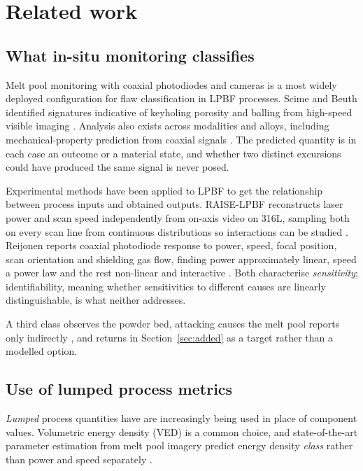 \documentclass[final,5p,times,twocolumn]{elsarticle}
\begin{document}
\section{Related work}

\subsection{What in-situ monitoring classifies}

Melt pool monitoring with coaxial photodiodes and cameras is a most widely
deployed configuration for flaw classification in LPBF processes.
Scime and Beuth identified signatures indicative of keyholing porosity and
balling from high-speed visible imaging \cite{Scime2019}. Analysis also exists across modalities and alloys, including mechanical-property prediction from
coaxial signals \cite{Raj2023}. The predicted quantity is in each case an outcome
or a material state, and whether two distinct excursions could have produced the
same signal is never posed.

Experimental methods have been applied to LPBF to get the relationship between process inputs and obtained outputs. RAISE-LPBF reconstructs laser power and scan speed independently from
on-axis video on 316L, sampling both on every scan line from continuous distributions
so interactions can be studied \cite{Blanc2024}. Reijonen reports coaxial
photodiode response to power, speed, focal position, scan orientation and
shielding gas flow, finding power approximately linear, speed a power law and the
rest non-linear and interactive \cite{Reijonen2024}. Both characterise
\emph{sensitivity}; identifiability, meaning whether sensitivities to different causes
are linearly distinguishable, is what neither addresses.

A third class observes the powder bed, attacking causes the melt pool reports
only indirectly \cite{Liu2022,Bugatti2022}, and returns in
Section~\ref{sec:added} as a target rather than a modelled option.

\subsection{Use of lumped process metrics}

\emph{Lumped} process quantities have are increasingly being used in place of component values. Volumetric energy density (VED) is a common choice, and
state-of-the-art parameter estimation from melt pool imagery predict
energy density \emph{class} rather than power and speed separately \cite{kNN2025}.
\end{document}
